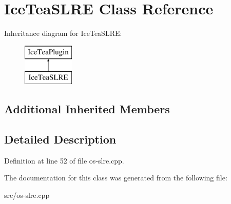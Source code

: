 \hypertarget{class_ice_tea_s_l_r_e}{}\section{Ice\+Tea\+S\+L\+RE Class Reference}
\label{class_ice_tea_s_l_r_e}
Inheritance diagram for Ice\+Tea\+S\+L\+RE\+:\begin{figure}[H]
\begin{center}
\leavevmode
\includegraphics[height=2.000000cm]{class_ice_tea_s_l_r_e}
\end{center}
\end{figure}
\subsection*{Additional Inherited Members}


\subsection{Detailed Description}


Definition at line 52 of file os-\/slre.\+cpp.



The documentation for this class was generated from the following file\+:\begin{DoxyCompactItemize}
\item 
src/os-\/slre.\+cpp\end{DoxyCompactItemize}

